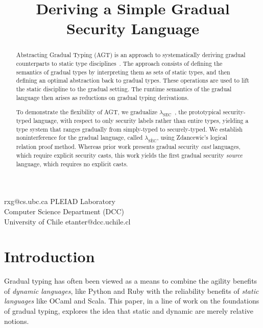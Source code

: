 \documentclass[authoryear,sort&compress,9pt,twocolumn,nocopyrightspace]{sigplanconf}
\newcommand{\lsec}{$\lambda_\text{SEC}$\xspace}
\newcommand{\lgsec}{$\lambda_{\consistent{\text{SEC}}}$\xspace}
\newcommand{\?}{\textsf{\upshape ?}} \newcommand{\consistent}[1]{\widetilde{#1}}
\begin{document}
\title{Deriving a Simple Gradual Security Language}

{rxg@cs.ubc.ca}
{PLEIAD Laboratory\\
Computer Science Department (DCC)\\
University of Chile}
{etanter@dcc.uchile.cl}

\maketitle

\begin{abstract}
  Abstracting Gradual Typing (AGT) is an approach to systematically deriving
  gradual counterparts to static type disciplines~\cite{garciaAl:popl2016}. The
  approach consists of defining the semantics of gradual types by interpreting
  them as sets of static types, and then defining an optimal abstraction back
  to gradual types. These operations are used to lift the static discipline to
  the gradual setting. The runtime semantics of the gradual language
  then arises as reductions on gradual typing derivations.

  To demonstrate the flexibility of AGT, we gradualize \linebreak
  \lsec~\cite{zdancewic},
  the prototypical security-typed language, with respect to only security
  labels rather than entire types, yielding a type system that ranges gradually
  from simply-typed to securely-typed. We establish noninterference for the
  gradual language, called \lgsec, using Zdancewic's logical relation proof
  method.  Whereas prior work presents gradual security \emph{cast} languages,
  which require explicit security casts, this work yields the first gradual
  security \emph{source} language, which requires no explicit casts.
\end{abstract}


\section{Introduction}

Gradual typing has often been viewed as a means to combine the agility benefits
of \emph{dynamic languages}, like Python and Ruby with the
reliability benefits of \emph{static languages} like OCaml and
Scala.  This paper, in a line of work on the foundations of gradual
typing, explores the idea that static and dynamic are merely relative notions.
\end{document}
